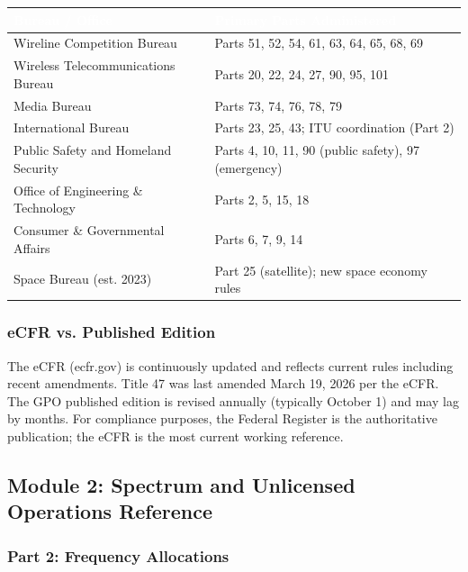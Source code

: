 \documentclass[11pt,letterpaper]{article}
\newcommand{\tableheader}[1]{\textbf{\sffamily\textcolor{white}{#1}}}
\begin{document}
\begin{center}
\begin{tabularx}{\textwidth}{L{4.5cm}X}
\toprule
{}
\tableheader{Bureau / Office} & \tableheader{Primary Parts Administered} \\
\midrule
Wireline Competition Bureau & Parts 51, 52, 54, 61, 63, 64, 65, 68, 69 \\
Wireless Telecommunications Bureau & Parts 20, 22, 24, 27, 90, 95, 101 \\
Media Bureau & Parts 73, 74, 76, 78, 79 \\
International Bureau & Parts 23, 25, 43; ITU coordination (Part 2) \\
Public Safety and Homeland Security & Parts 4, 10, 11, 90 (public safety), 97 (emergency) \\
Office of Engineering \& Technology & Parts 2, 5, 15, 18 \\
Consumer \& Governmental Affairs & Parts 6, 7, 9, 14 \\
Space Bureau (est. 2023) & Part 25 (satellite); new space economy rules \\
\bottomrule
\end{tabularx}
\end{center}

\subsubsection{eCFR vs. Published Edition}

The eCFR (ecfr.gov) is continuously updated and reflects current rules including recent amendments. Title 47 was last amended March 19, 2026 per the eCFR. The GPO published edition is revised annually (typically October 1) and may lag by months. For compliance purposes, the Federal Register is the authoritative publication; the eCFR is the most current working reference.

\subsection{Module 2: Spectrum and Unlicensed Operations Reference}

\subsubsection{Part 2: Frequency Allocations}
\end{document}
